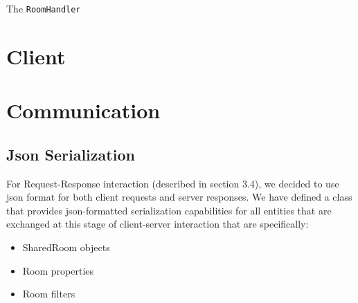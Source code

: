 The \texttt{RoomHandler}

\section{Client}

\section{Communication}\label{sec:communication_design}


\subsection{Json Serialization}
For Request-Response interaction (described in section 3.4), we decided to use json format for both client requests and server responses. We have defined a class that provides json-formatted serialization capabilities for all entities that are exchanged at this stage of client-server interaction that are specifically:
\begin{itemize}
	\item SharedRoom objects
	\item Room properties
	\item Room filters
\end{itemize}

